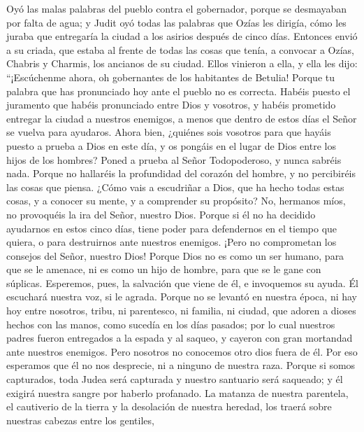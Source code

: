  Oyó las malas palabras del pueblo contra el gobernador,
porque se desmayaban por falta de agua; y Judit oyó todas las palabras
que Ozías les dirigía, cómo les juraba que entregaría la ciudad a los
asirios después de cinco días.  Entonces envió a su
criada, que estaba al frente de todas las cosas que tenía, a convocar a
Ozías, Chabris y Charmis, los ancianos de su ciudad. 
Ellos vinieron a ella, y ella les dijo: ``¡Escúchenme ahora, oh
gobernantes de los habitantes de Betulia! Porque tu palabra que has
pronunciado hoy ante el pueblo no es correcta. Habéis puesto el
juramento que habéis pronunciado entre Dios y vosotros, y habéis
prometido entregar la ciudad a nuestros enemigos, a menos que dentro de
estos días el Señor se vuelva para ayudaros.  Ahora bien,
¿quiénes sois vosotros para que hayáis puesto a prueba a Dios en este
día, y os pongáis en el lugar de Dios entre los hijos de los hombres?
 Poned a prueba al Señor Todopoderoso, y nunca sabréis
nada.  Porque no hallaréis la profundidad del corazón del
hombre, y no percibiréis las cosas que piensa. ¿Cómo vais a escudriñar a
Dios, que ha hecho todas estas cosas, y a conocer su mente, y a
comprender su propósito? No, hermanos míos, no provoquéis la ira del
Señor, nuestro Dios.  Porque si él no ha decidido
ayudarnos en estos cinco días, tiene poder para defendernos en el tiempo
que quiera, o para destruirnos ante nuestros enemigos. 
¡Pero no comprometan los consejos del Señor, nuestro Dios! Porque Dios
no es como un ser humano, para que se le amenace, ni es como un hijo de
hombre, para que se le gane con súplicas.  Esperemos,
pues, la salvación que viene de él, e invoquemos su ayuda. Él escuchará
nuestra voz, si le agrada.  Porque no se levantó en
nuestra época, ni hay hoy entre nosotros, tribu, ni parentesco, ni
familia, ni ciudad, que adoren a dioses hechos con las manos, como
sucedía en los días pasados;  por lo cual nuestros padres
fueron entregados a la espada y al saqueo, y cayeron con gran mortandad
ante nuestros enemigos.  Pero nosotros no conocemos otro
dios fuera de él. Por eso esperamos que él no nos desprecie, ni a
ninguno de nuestra raza.  Porque si somos capturados,
toda Judea será capturada y nuestro santuario será saqueado; y él
exigirá nuestra sangre por haberlo profanado.  La matanza
de nuestra parentela, el cautiverio de la tierra y la desolación de
nuestra heredad, los traerá sobre nuestras cabezas entre los gentiles,
